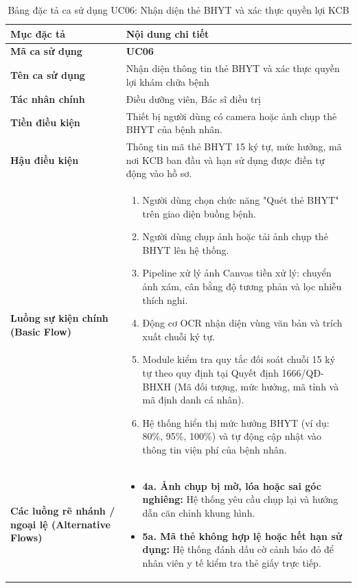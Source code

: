 \begin{table}[htbp]
\centering
\small
\begin{tabularx}{\textwidth}{L{3.2cm} Y}
\toprule
\textbf{Mục đặc tả} & \textbf{Nội dung chi tiết} \\
\midrule
\textbf{Mã ca sử dụng} & \textbf{UC06} \\
\textbf{Tên ca sử dụng} & Nhận diện thông tin thẻ BHYT và xác thực quyền lợi khám chữa bệnh \\
\textbf{Tác nhân chính} & Điều dưỡng viên, Bác sĩ điều trị \\
\textbf{Tiền điều kiện} & Thiết bị người dùng có camera hoặc ảnh chụp thẻ BHYT của bệnh nhân. \\
\textbf{Hậu điều kiện} & Thông tin mã thẻ BHYT 15 ký tự, mức hưởng, mã nơi KCB ban đầu và hạn sử dụng được điền tự động vào hồ sơ. \\
\midrule
\textbf{Luồng sự kiện chính (Basic Flow)} & 
\begin{enumerate}[leftmargin=1.2em, topsep=0pt, partopsep=0pt]
    \item Người dùng chọn chức năng "Quét thẻ BHYT" trên giao diện buồng bệnh.
    \item Người dùng chụp ảnh hoặc tải ảnh chụp thẻ BHYT lên hệ thống.
    \item Pipeline xử lý ảnh Canvas tiền xử lý: chuyển ảnh xám, cân bằng độ tương phản và lọc nhiễu thích nghi.
    \item Động cơ OCR nhận diện vùng văn bản và trích xuất chuỗi ký tự.
    \item Module kiểm tra quy tắc đối soát chuỗi 15 ký tự theo quy định tại Quyết định 1666/QĐ-BHXH (Mã đối tượng, mức hưởng, mã tỉnh và mã định danh cá nhân).
    \item Hệ thống hiển thị mức hưởng BHYT (ví dụ: 80\%, 95\%, 100\%) và tự động cập nhật vào thông tin viện phí của bệnh nhân.
\end{enumerate} \\
\midrule
\textbf{Các luồng rẽ nhánh / ngoại lệ (Alternative Flows)} & 
\begin{itemize}[leftmargin=1.2em, topsep=0pt, partopsep=0pt]
    \item \textbf{4a. Ảnh chụp bị mờ, lóa hoặc sai góc nghiêng:} Hệ thống yêu cầu chụp lại và hướng dẫn căn chỉnh khung hình.
    \item \textbf{5a. Mã thẻ không hợp lệ hoặc hết hạn sử dụng:} Hệ thống đánh dấu cờ cảnh báo đỏ để nhân viên y tế kiểm tra thẻ giấy trực tiếp.
\end{itemize} \\
\bottomrule
\end{tabularx}
\caption{Bảng đặc tả ca sử dụng UC06: Nhận diện thẻ BHYT và xác thực quyền lợi KCB}
\label{tab:uc06_spec}
\end{table}

